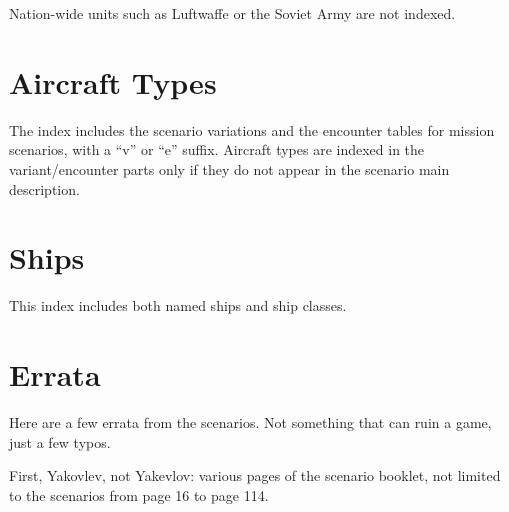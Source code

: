 \documentclass[a4paper,twocolumn]{article}
\begin{document}
Nation-wide units such as Luftwaffe or the Soviet Army are not indexed.

\vspace{1mm}


\vspace{1mm}

\section*{Aircraft Types}

The index includes the scenario variations and the encounter
tables for mission scenarios, with a ``v'' or ``e''
suffix. Aircraft types are indexed in the variant/encounter parts only if they do not appear in the
scenario main description.

\vspace{1mm}


\section*{Ships}

This index includes both named ships and ship classes.

\vspace{1mm}


\section*{Errata}

Here are a few errata from the scenarios. Not something that can ruin a game, just
a few typos.

\vspace{3mm}

First, Yakovlev, not Yakevlov: various pages of the scenario booklet, not limited
to the scenarios from page 16 to page 114.

\vspace{3mm}

\end{document}
